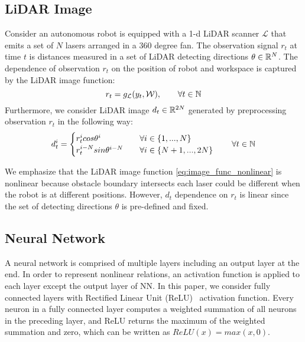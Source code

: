 \subsection{LiDAR Image}

Consider an autonomous robot is equipped with a 1-d LiDAR scanner $\mathcal{L}$ 
that emits a set of $N$ lasers arranged in a $360$ degree fan.
The observation signal $r_t$ at time $t$ is distances measured in a set of LiDAR detecting directions $\theta \in {\mathbb{R}}^N$.
The dependence of observation $r_t$ on the position of robot and workspace is captured by the LiDAR image function:
\begin{equation}
    \label{eq:image_func_nonlinear}
    r_t = g_{\mathcal{L}}(y_t, {\mathcal{W}}), \qquad \forall t \in {\mathbb{N}}
\end{equation}    
Furthermore, we consider LiDAR image $d_t \in {\mathbb{R}}^{2N}$ generated by preprocessing observation $r_t$ in the following way:
\begin{equation}
    \label{eq:image}
    d_t^i =
    \begin{cases} 
      r_t^i cos \theta^i  & \quad \forall i \in \{1, ..., N\} \\
      r_t^{i-N} sin \theta^{i-N}  & \quad \forall i \in \{N+1, ..., 2N\} 
    \end{cases}
    \qquad \forall t \in {\mathbb{N}}
\end{equation}

We emphasize that the LiDAR image function \eqref{eq:image_func_nonlinear} is nonlinear 
because obstacle boundary intersects each laser could be different when the robot is at different positions.
However, $d_t$ dependence on $r_t$ is linear since the set of detecting directions $\theta$ is pre-defined and fixed.




\subsection{Neural Network}

A neural network is comprised of multiple layers including an output layer at the end.
In order to represent nonlinear relations, an activation function is applied to each layer except the output layer of NN.
In this paper, we consider fully connected layers with Rectified Linear Unit (ReLU)~\cite{Hinton2010ReLU} activation function.
Every neuron in a fully connected layer computes a weighted summation of all neurons in the preceding layer, 
and ReLU returns the maximum of the weighted summation and zero, which can be written as $ReLU(x) = max(x, 0)$.

